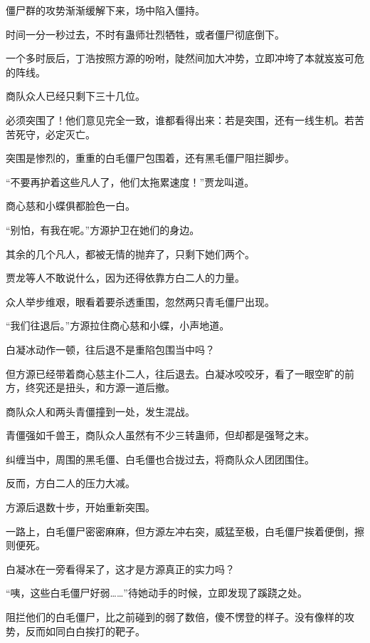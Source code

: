
\begin{this_body}

僵尸群的攻势渐渐缓解下来，场中陷入僵持。

时间一分一秒过去，不时有蛊师壮烈牺牲，或者僵尸彻底倒下。

一个多时辰后，丁浩按照方源的吩咐，陡然间加大冲势，立即冲垮了本就岌岌可危的阵线。

商队众人已经只剩下三十几位。

必须突围了！他们意见完全一致，谁都看得出来：若是突围，还有一线生机。若苦苦死守，必定灭亡。

突围是惨烈的，重重的白毛僵尸包围着，还有黑毛僵尸阻拦脚步。

“不要再护着这些凡人了，他们太拖累速度！”贾龙叫道。

商心慈和小蝶俱都脸色一白。

“别怕，有我在呢。”方源护卫在她们的身边。

其余的几个凡人，都被无情的抛弃了，只剩下她们两个。

贾龙等人不敢说什么，因为还得依靠方白二人的力量。

众人举步维艰，眼看着要杀透重围，忽然两只青毛僵尸出现。

“我们往退后。”方源拉住商心慈和小蝶，小声地道。

白凝冰动作一顿，往后退不是重陷包围当中吗？

但方源已经带着商心慈主仆二人，往后退去。白凝冰咬咬牙，看了一眼空旷的前方，终究还是扭头，和方源一道后撤。

商队众人和两头青僵撞到一处，发生混战。

青僵强如千兽王，商队众人虽然有不少三转蛊师，但却都是强弩之末。

纠缠当中，周围的黑毛僵、白毛僵也合拢过去，将商队众人团团围住。

反而，方白二人的压力大减。

方源后退数十步，开始重新突围。

一路上，白毛僵尸密密麻麻，但方源左冲右突，威猛至极，白毛僵尸挨着便倒，擦则便死。

白凝冰在一旁看得呆了，这才是方源真正的实力吗？

“咦，这些白毛僵尸好弱……”待她动手的时候，立即发现了蹊跷之处。

阻拦他们的白毛僵尸，比之前碰到的弱了数倍，傻不愣登的样子。没有像样的攻势，反而如同白白挨打的靶子。


\end{this_body}
